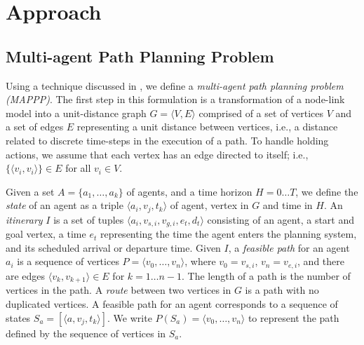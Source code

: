 \documentclass[letterpaper, 10 pt, conference]{ieeeconf}
\begin{document}
\section{Approach}
\subsection{Multi-agent Path Planning Problem}

Using a technique discussed in \cite{flow}, we define a {\em multi-agent path planning problem (MAPPP)}. The first step in this formulation is a transformation of a node-link model into a unit-distance graph $G = \langle V, E \rangle$ comprised of a set of vertices $V$ and a set of edges $E$ representing a unit distance between vertices, i.e., a distance related to discrete time-steps in the execution of a path. To handle holding actions, we assume that each vertex has an edge directed to itself; i.e., $\{ \langle v_i, v_i \rangle \} \in E$ for all $v_i \in V$.

Given a set $A = \{a_1,\ldots,a_k\}$ of agents, and a time horizon $H = 0 \ldots T$, we define the {\em state} of an agent as a triple $\langle a_i, v_j, t_k \rangle$ of agent, vertex in $G$ and time in $H$. An {\em itinerary} $I$ is a set of tuples $\langle a_i, v_{s,i}, v_{g,i}, e_t, d_t \rangle$ consisting of an agent, a start and goal vertex, a time $e_t$ representing the time the agent enters the planning system, and its scheduled arrival or departure time. Given $I$, a {\em feasible path} for an agent $a_i$ is a sequence of vertices $P = \langle v_0, \ldots, v_n \rangle$, where $v_0 = v_{s,i}$, $v_n = v_{e,i}$, and there are edges $\langle v_k, v_{k+1}\rangle \in E$ for $k = 1 \ldots n-1$.  The length of a path is the number of vertices in the path. A {\em route} between two vertices in $G$ is a path with no duplicated vertices.  A feasible path for an agent corresponds to a sequence of states $S_a = [ \langle a, v_j, t_k \rangle]$. We write $P(S_a ) = \langle v_0, \ldots, v_n \rangle$ to represent the path defined by the sequence of vertices in $S_a$.
\end{document}
